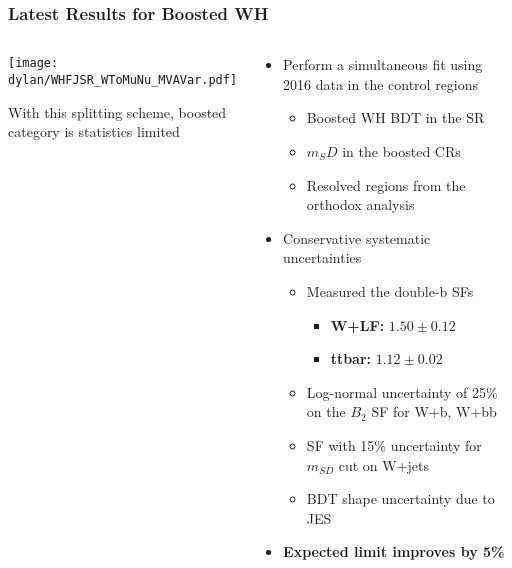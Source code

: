 \documentclass{beamer}
\begin{document}
\begin{frame}
  \frametitle{Latest Results for Boosted WH}
  \begin{columns}
    \begin{column}{0.4\linewidth}
      \hspace*{-0.1\linewidth}
      \texttt{[image: dylan/WHFJSR\_WToMuNu\_MVAVar.pdf]}

      {With this splitting scheme, boosted category is statistics limited}

    \end{column}
    \begin{column}{0.7\linewidth}
      \begin{itemize}
      \item Perform a simultaneous fit using 2016 data in the control regions
        \begin{itemize}
        \item Boosted WH BDT in the SR
        \item $m_SD$ in the boosted CRs
        \item Resolved regions from the orthodox analysis
        \end{itemize}
      \item Conservative systematic uncertainties
        \begin{itemize}
        \item Measured the double-b SFs
          \begin{itemize}
          \item {\bf W+LF:} $1.50 \pm 0.12$
          \item {\bf ttbar:} $1.12 \pm 0.02$
          \end{itemize}
        \item Log-normal uncertainty of 25\% on the $B_2$ SF for W+b, W+bb
        \item SF with 15\% uncertainty for $m_{SD}$ cut on W+jets
        \item BDT shape uncertainty due to JES
        \end{itemize}
      \item {\bf Expected limit improves by 5\%}
      \end{itemize}
    \end{column}
  \end{columns}
\end{frame}
\end{document}
